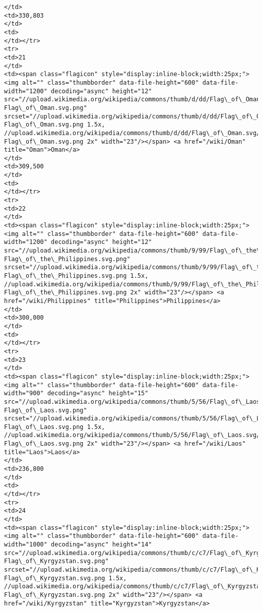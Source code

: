 \documentclass[11pt]{article}
\begin{document}
\begin{Verbatim}[commandchars=\\\{\}]
</td>
<td>330,803
</td>
<td>
</td></tr>
<tr>
<td>21
</td>
<td><span class="flagicon" style="display:inline-block;width:25px;"><img alt="" class="thumbborder" data-file-height="600" data-file-width="1200" decoding="async" height="12" src="//upload.wikimedia.org/wikipedia/commons/thumb/d/dd/Flag\_of\_Oman.svg/23px-Flag\_of\_Oman.svg.png" srcset="//upload.wikimedia.org/wikipedia/commons/thumb/d/dd/Flag\_of\_Oman.svg/35px-Flag\_of\_Oman.svg.png 1.5x, //upload.wikimedia.org/wikipedia/commons/thumb/d/dd/Flag\_of\_Oman.svg/46px-Flag\_of\_Oman.svg.png 2x" width="23"/></span> <a href="/wiki/Oman" title="Oman">Oman</a>
</td>
<td>309,500
</td>
<td>
</td></tr>
<tr>
<td>22
</td>
<td><span class="flagicon" style="display:inline-block;width:25px;"><img alt="" class="thumbborder" data-file-height="600" data-file-width="1200" decoding="async" height="12" src="//upload.wikimedia.org/wikipedia/commons/thumb/9/99/Flag\_of\_the\_Philippines.svg/23px-Flag\_of\_the\_Philippines.svg.png" srcset="//upload.wikimedia.org/wikipedia/commons/thumb/9/99/Flag\_of\_the\_Philippines.svg/35px-Flag\_of\_the\_Philippines.svg.png 1.5x, //upload.wikimedia.org/wikipedia/commons/thumb/9/99/Flag\_of\_the\_Philippines.svg/46px-Flag\_of\_the\_Philippines.svg.png 2x" width="23"/></span> <a href="/wiki/Philippines" title="Philippines">Philippines</a>
</td>
<td>300,000
</td>
<td>
</td></tr>
<tr>
<td>23
</td>
<td><span class="flagicon" style="display:inline-block;width:25px;"><img alt="" class="thumbborder" data-file-height="600" data-file-width="900" decoding="async" height="15" src="//upload.wikimedia.org/wikipedia/commons/thumb/5/56/Flag\_of\_Laos.svg/23px-Flag\_of\_Laos.svg.png" srcset="//upload.wikimedia.org/wikipedia/commons/thumb/5/56/Flag\_of\_Laos.svg/35px-Flag\_of\_Laos.svg.png 1.5x, //upload.wikimedia.org/wikipedia/commons/thumb/5/56/Flag\_of\_Laos.svg/45px-Flag\_of\_Laos.svg.png 2x" width="23"/></span> <a href="/wiki/Laos" title="Laos">Laos</a>
</td>
<td>236,800
</td>
<td>
</td></tr>
<tr>
<td>24
</td>
<td><span class="flagicon" style="display:inline-block;width:25px;"><img alt="" class="thumbborder" data-file-height="600" data-file-width="1000" decoding="async" height="14" src="//upload.wikimedia.org/wikipedia/commons/thumb/c/c7/Flag\_of\_Kyrgyzstan.svg/23px-Flag\_of\_Kyrgyzstan.svg.png" srcset="//upload.wikimedia.org/wikipedia/commons/thumb/c/c7/Flag\_of\_Kyrgyzstan.svg/35px-Flag\_of\_Kyrgyzstan.svg.png 1.5x, //upload.wikimedia.org/wikipedia/commons/thumb/c/c7/Flag\_of\_Kyrgyzstan.svg/46px-Flag\_of\_Kyrgyzstan.svg.png 2x" width="23"/></span> <a href="/wiki/Kyrgyzstan" title="Kyrgyzstan">Kyrgyzstan</a>

\end{Verbatim}
\end{document}
